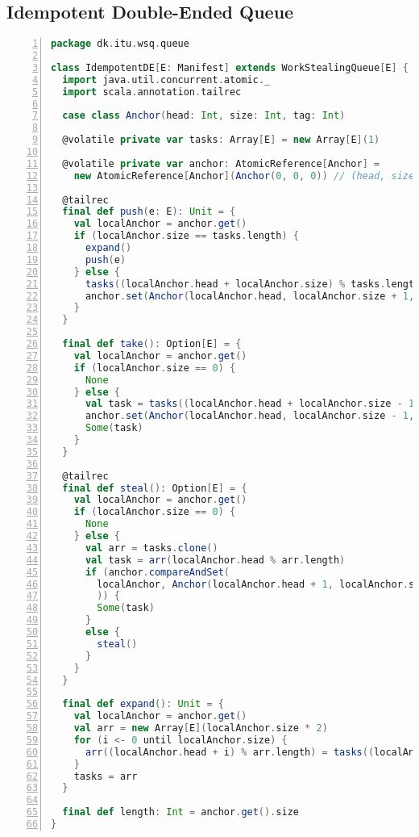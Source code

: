 \subsection{Idempotent Double-Ended Queue}
\begin{lstlisting}[language=scala,basicstyle=\ttfamily\bfseries\scriptsize,numbers=left]
package dk.itu.wsq.queue

class IdempotentDE[E: Manifest] extends WorkStealingQueue[E] {
  import java.util.concurrent.atomic._
  import scala.annotation.tailrec

  case class Anchor(head: Int, size: Int, tag: Int)

  @volatile private var tasks: Array[E] = new Array[E](1)

  @volatile private var anchor: AtomicReference[Anchor] = 
    new AtomicReference[Anchor](Anchor(0, 0, 0)) // (head, size, tag)

  @tailrec
  final def push(e: E): Unit = {
    val localAnchor = anchor.get()
    if (localAnchor.size == tasks.length) {
      expand()
      push(e)
    } else {
      tasks((localAnchor.head + localAnchor.size) % tasks.length) = e
      anchor.set(Anchor(localAnchor.head, localAnchor.size + 1, localAnchor.tag + 1))
    }
  }

  final def take(): Option[E] = {
    val localAnchor = anchor.get()
    if (localAnchor.size == 0) {
      None
    } else {
      val task = tasks((localAnchor.head + localAnchor.size - 1) % tasks.length)
      anchor.set(Anchor(localAnchor.head, localAnchor.size - 1, localAnchor.tag))
      Some(task)
    }
  }

  @tailrec
  final def steal(): Option[E] = {
    val localAnchor = anchor.get()
    if (localAnchor.size == 0) {
      None
    } else {
      val arr = tasks.clone()
      val task = arr(localAnchor.head % arr.length)
      if (anchor.compareAndSet(
      	localAnchor, Anchor(localAnchor.head + 1, localAnchor.size - 1, localAnchor.tag)
      	)) {
        Some(task)
      }
      else {
        steal()
      }
    }
  }

  final def expand(): Unit = {
    val localAnchor = anchor.get()
    val arr = new Array[E](localAnchor.size * 2)
    for (i <- 0 until localAnchor.size) {
      arr((localAnchor.head + i) % arr.length) = tasks((localAnchor.head + i) % tasks.length)
    }
    tasks = arr
  }

  final def length: Int = anchor.get().size
}

\end{lstlisting}

